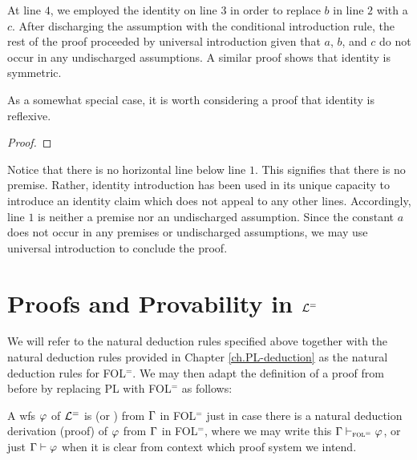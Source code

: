 At line $4$, we employed the identity on line $3$ in order to replace $b$ in line $2$ with a $c$.
After discharging the assumption with the conditional introduction rule, the rest of the proof proceeded by universal introduction given that $a$, $b$, and $c$ do not occur in any undischarged assumptions. 
A similar proof shows that identity is symmetric.

As a somewhat special case, it is worth considering a proof that identity is reflexive.

\begin{proof}
    
   
\end{proof}

Notice that there is no horizontal line below line $1$.
This signifies that there is no premise.
Rather, identity introduction has been used in its unique capacity to introduce an identity claim which does not appeal to any other lines.
Accordingly, line $1$ is neither a premise nor an undischarged assumption.
Since the constant $a$ does not occur in any premises or undischarged assumptions, we may use universal introduction to conclude the proof.




\section{Proofs and Provability in $\mathcal{L}^{=}$}

We will refer to the natural deduction rules specified above together with the natural deduction rules provided in Chapter \ref{ch.PL-deduction} as the natural deduction rules for FOL$^=$.
We may then adapt the definition of a proof from before by replacing PL with FOL$^=$ as follows:


A wfs $\varphi$ of $\mathcal{L}^{=}$ is  (or ) from $\Gamma$ in FOL$^=$ just in case there is a natural deduction derivation (proof) of $\varphi$ from $\Gamma$ in FOL$^=$, where we may write this $\Gamma \vdash_{\textsc{fol}^=} \varphi$, or just $\Gamma \vdash \varphi$ when it is clear from context which proof system we intend.  


